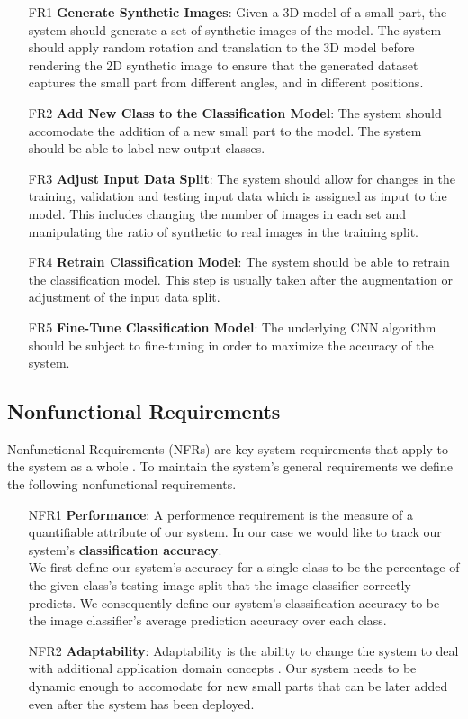 \begin{itemize}
  \item [FR1] \textbf{Generate Synthetic Images}: Given a 3D model of a small part, the system should generate a set of synthetic images of the model. The system should apply random rotation and translation to the 3D model before rendering the 2D synthetic image to ensure that the generated dataset captures the small part from different angles, and in different positions.

  \item [FR2] \textbf{Add New Class to the Classification Model}: The system should accomodate the addition of a new small part to the model. The system should be able to label new output classes.

  \item [FR3] \textbf{Adjust Input Data Split}: The system should allow for changes in the training, validation and testing input data which is assigned as input to the model. This includes changing the number of images in each set and manipulating the ratio of synthetic to real images in the training split.

  \item [FR4] \textbf{Retrain Classification Model}: The system should be able to retrain the classification model. This step is usually taken after the augmentation or adjustment of the input data split.

  \item [FR5] \textbf{Fine-Tune Classification Model}: The underlying CNN algorithm should be subject to fine-tuning in order to maximize the accuracy of the system.
\end{itemize}

\subsection{Nonfunctional Requirements}

Nonfunctional Requirements (NFRs) are key system requirements that apply to the system as a whole \cite{bruegge2004object}. To maintain the system's general requirements we define the following nonfunctional requirements.

\begin{itemize}
  \item [NFR1] \textbf{Performance}: A performence requirement is the measure of a quantifiable attribute of our system. In our case we would like to track our system's \textbf{classification accuracy}.\\
  We first define our system's accuracy for a single class to be the percentage of the given class's testing image split that the image classifier correctly predicts. We consequently define our system's classification accuracy to be the image classifier's average prediction accuracy over each class.

  \item [NFR2] \textbf{Adaptability}: Adaptability is the ability to change the system to deal with additional application domain concepts \cite{bruegge2004object}. Our system needs to be dynamic enough to accomodate for new small parts that can be later added even after the system has been deployed.
\end{itemize}

